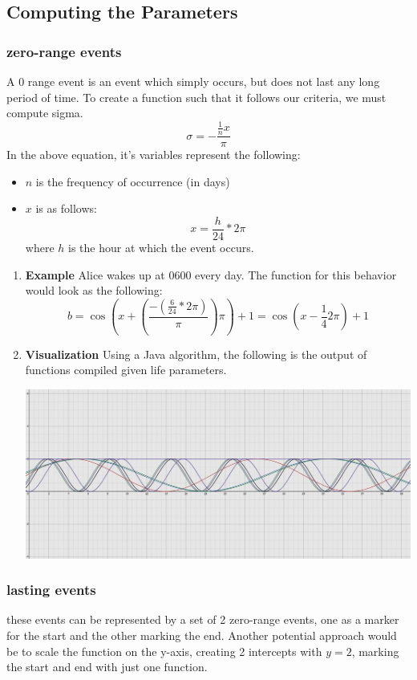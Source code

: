 \documentclass[11pt]{article}
\begin{document}
\subsection{Computing the Parameters}
\label{sec:org5147367}
\subsubsection{zero-range events}
\label{sec:org6ec9402}
A 0 range event is an event which simply occurs, but does not last any long period of time. To create a function such that it follows our criteria, we must compute sigma.
\begin{equation}
    \sigma = -\frac{\frac{1}{n}x}{\pi}
\end{equation}
In the above equation, it's variables represent the following:
\begin{itemize}
\item \(n\) is the frequency of occurrence (in days)
\item \(x\) is as follows:
\begin{equation}
  x = \frac{h}{24} * 2\pi
\end{equation}
where \(h\) is the hour at which the event occurs.
\end{itemize}
\begin{enumerate}
\item \textbf{Example}
\label{sec:org22ac5f2}
Alice wakes up at 0600 every day. The function for this behavior would look as the following:
\begin{equation}
b = \cos{( x + (\frac{-(\frac{6}{24}*2\pi)}{\pi})\pi )} + 1 = \cos{(x-\frac{1}{4}2\pi)}+1
\end{equation}
\item \textbf{Visualization}
\label{sec:org6da0c94}
Using a Java algorithm, the following is the output of functions compiled given life parameters.
\begin{center}
\includegraphics[width=.9\linewidth]{./media/life01.jpg}
\end{center}
\end{enumerate}
\subsubsection{lasting events}
\label{sec:org76174a4}
these events can be represented by a set of 2 zero-range events, one as a marker for the start and the other marking the end. Another potential approach would be to scale the function on the y-axis, creating 2 intercepts with \(y=2\), marking the start and end with just one function.
\end{document}
